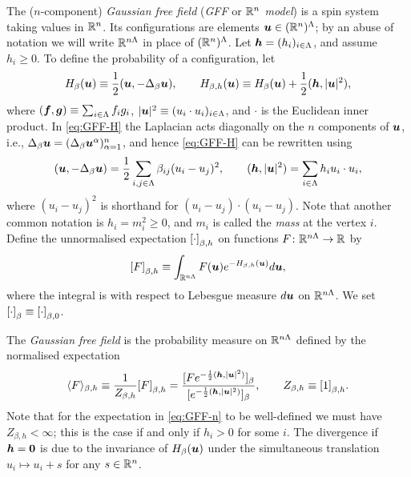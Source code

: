 \documentclass[11pt,a4paper]{article}
\begin{document}
The ($n$-component) \emph{Gaussian free field} (\emph{GFF} or
\emph{$\mathbb{R}^{n}$ model}) is a spin system
taking values in $\mathbb{R}^{n}$. Its configurations are elements
$\boldsymbol{u}\in (\mathbb{R}^{n})^{\Lambda}$; by an abuse of notation we will write
$\mathbb{R}^{n\Lambda}$ in place of $(\mathbb{R}^{n})^{\Lambda}$.
Let $\boldsymbol{h} = (h_{i})_{i\in\Lambda}$, and assume $h_{i}\geq 0$.
To define the probability of a configuration, let
\begin{equation}
  \label{eq:GFF-H}
  H_{\beta}(\boldsymbol{u})
  \equiv
  \frac{1}{2}(\boldsymbol{u},-\Delta_\beta \boldsymbol{u}),
  \qquad H_{\beta,h}(\boldsymbol{u})\equiv
   H_{\beta}(\boldsymbol{u}) + {\frac{1}{2}(\boldsymbol{h},|\boldsymbol{u}|^2)},
\end{equation}
where $(\boldsymbol{f},\boldsymbol{g}) \equiv \sum_{i\in\Lambda}f_{i}g_{i}$, 
$|\boldsymbol{u}|^{2}\equiv (u_{i}\cdot u_{i})_{i\in\Lambda}$, and
$\cdot$ is the Euclidean inner product. In
\eqref{eq:GFF-H} the Laplacian acts diagonally on the $n$ components
of $\boldsymbol{u}$, i.e.,
$\Delta_{\beta}\boldsymbol{u} = (\Delta_{\beta}\boldsymbol{u}^{\alpha})_{\alpha =1}^{n}$,
and hence \eqref{eq:GFF-H} can be rewritten using
\begin{equation}
  (\boldsymbol{u},-\Delta_\beta \boldsymbol{u})
  = 
  \frac{1}{2}\sum_{i,j\in \Lambda}\beta_{ij}(u_{i}-u_{j})^{2}
,\qquad
   (\boldsymbol{h},|\boldsymbol{u}|^2) =
   \sum_{i\in \Lambda}h_{i}u_{i}\cdot u_{i},
\end{equation}
where $(u_{i}-u_{j})^{2}$ is shorthand for $(u_{i}-u_{j})\cdot (u_{i}-u_{j})$.
Note that another common notation is $h_{i}=m_{i}^{2}\geq 0$,
and $m_{i}$ is called the \emph{mass} at the vertex $i$.  Define the
unnormalised expectation $\cb{\cdot}_{\beta,h}$ on functions
$F\colon \mathbb{R}^{n\Lambda}\to \mathbb{R}$ by
\begin{equation}
  \label{eq:GFF-un}
  \cb{F}_{\beta,h} \bydef \int_{\R^{n\Lambda}}F(\V{u})e^{-H_{\beta,h}(\V{u})}d\V{u},
\end{equation}
where the integral is with respect to Lebesgue measure $d\boldsymbol{u}$ on $\mathbb{R}^{n\Lambda}$. 
We set $\cb{\cdot}_{\beta} \bydef\cb{\cdot}_{\beta,0}$.  

The \emph{Gaussian free field}
is the probability measure on $\mathbb{R}^{n\Lambda}$ defined by the
normalised expectation
\begin{equation}
  \label{eq:GFF-n}
  \avg{F}_{\beta,h} \bydef \frac{1}{Z_{\beta,h}}\cb{F}_{\beta,h}
 =\frac{\q{F e^{-{\frac{1}{2}(\V{h},|\V{u}|^2)}}}_{\beta}} 
  {\q{ e^{-{\frac{1}{2}(\V{h},|\V{u}|^2)}}}_{\beta}}
  ,
  \qquad Z_{\beta,h} \bydef \cb{1}_{\beta,h}.
\end{equation}
Note that for the expectation in \eqref{eq:GFF-n} to be
well-defined we must have $Z_{\beta,h} <\infty$; this is the case
if and only if $h_{i}>0$ for some $i$. The divergence if $\boldsymbol{h}=\boldsymbol{0}$ is due
to the invariance of $H_{\beta}(\boldsymbol{u})$ under the simultaneous
translation $u_{i}\mapsto u_{i}+s$ for any $s\in\mathbb{R}^{n}$.
\end{document}
